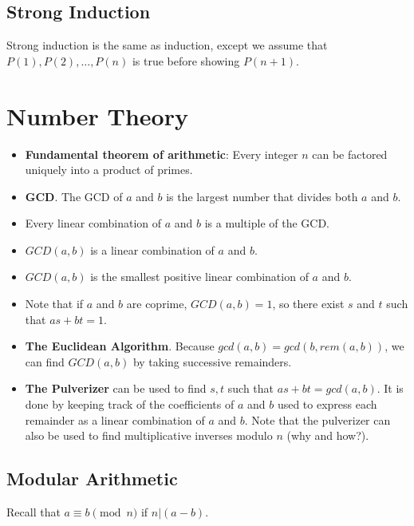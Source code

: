 \documentclass[11pt]{article}
\begin{document}
\subsection{Strong Induction}
	Strong induction is the same as induction, except we assume that $P(1), P(2), \ldots,
		P(n)$ is true before showing $P(n+1)$.
		
\section{Number Theory}
	\begin{itemize}
		\item \textbf{Fundamental theorem of arithmetic}: Every integer $n$ can be factored
		uniquely into a product of primes.
		\item \textbf{GCD}.  The GCD of $a$ and $b$ is the largest number that divides both $a$ and $b$.  
		\item Every linear combination of $a$ and $b$ is a multiple of the GCD.
		\item $GCD(a, b)$ is a linear combination of $a$ and $b$.
		\item $GCD(a, b)$ is the smallest positive linear combination of $a$ and $b$.
		\item Note that if $a$ and $b$ are coprime, $GCD(a, b) = 1$, so there exist
		$s$ and $t$ such that $as + bt = 1$.
		
		\item \textbf{The Euclidean Algorithm}.  Because $gcd(a, b) = gcd(b, rem(a, b))$, 
		we can find $GCD(a, b)$ by taking successive remainders.
		\item \textbf{The Pulverizer} can be used to find $s, t$ such that $as + bt = gcd(a,b)$. It is done by keeping track of the coefficients of $a$ and $b$ used to express each remainder as a linear combination of $a$ and $b$.  Note that the pulverizer can
		also be used to find multiplicative inverses modulo $n$ (why and how?).
	\end{itemize}
	
	\subsection{Modular Arithmetic}
	Recall that $a \equiv b \pmod{n}$ if $n | (a-b)$.
	
\end{document}
